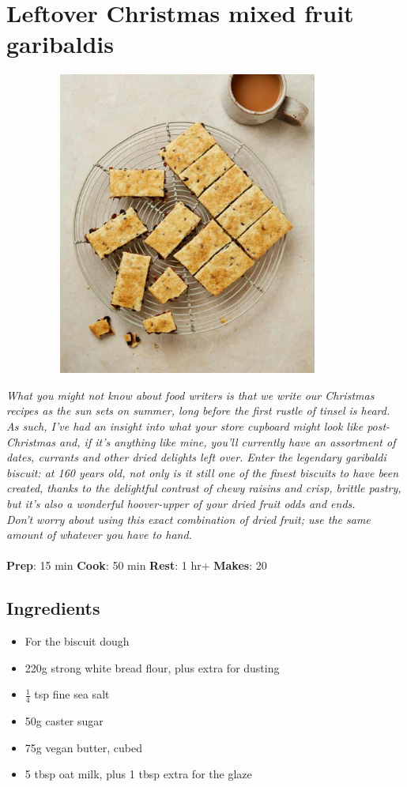 \documentclass{book}
\begin{document}
\section{Leftover Christmas mixed fruit garibaldis}
\begin{figure}
\centering\includegraphics[width=10cm,height=10cm,keepaspectratio]{Recipe_Pictures/Leftover_Christmas_mixed_fruit_garibaldis.png}
\end{figure}
\emph{What you might not know about food writers is that we write our Christmas recipes as the sun sets on summer, long before the first rustle of tinsel is heard. As such, I’ve had an insight into what your store cupboard might look like post-Christmas and, if it’s anything like mine, you’ll currently have an assortment of dates, currants and other dried delights left over. Enter the legendary garibaldi biscuit: at 160 years old, not only is it still one of the finest biscuits to have been created, thanks to the delightful contrast of chewy raisins and crisp, brittle pastry, but it’s also a wonderful hoover-upper of your dried fruit odds and ends.\\ 
Don’t worry about using this exact combination of dried fruit; use the same amount of whatever you have to hand.}\\\\ 
\textbf{Prep}: 15 min
\textbf{Cook}: 50 min
\textbf{Rest}: 1 hr+
\textbf{Makes}: 20
\subsection*{Ingredients}
\begin{itemize}
\item For the biscuit dough
\item 220g strong white bread flour, plus extra for dusting
\item $\frac{1}{4}$ tsp fine sea salt
\item 50g caster sugar
\item 75g vegan butter, cubed
\item 5 tbsp oat milk, plus 1 tbsp extra for the glaze
\end{itemize}
\end{document}
